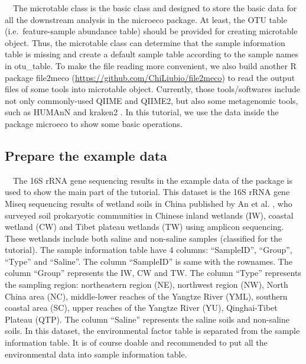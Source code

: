 \documentclass[
]{book}
\begin{document}
　The microtable class is the basic class and designed to store the basic data for all the downstream analysis in the microeco package.
At least, the OTU table (i.e.~feature-sample abundance table) should be provided for creating microtable object.
Thus, the microtable class can determine that the sample information table is missing and create a default sample table according to
the sample names in otu\_table.
To make the file reading more convenient,
we also build another R package file2meco (\url{https://github.com/ChiLiubio/file2meco}) to read the output files of some tools into microtable object.
Currently, those tools/softwares include not only commonly-used QIIME \citep{Caporaso_QIIME_2010} and QIIME2\citep{Bolyen_Reproducible_2019},
but also some metagenomic tools, such as HUMAnN \citep{Franzosa_Species_2018} and kraken2 \citep{Wood_Improved_2019}.
In this tutorial, we use the data inside the package microeco to show some basic operations.

\hypertarget{prepare-the-example-data}{%
\subsection{Prepare the example data}\label{prepare-the-example-data}}

　The 16S rRNA gene sequencing results in the example data of the package is used to show the main part of the tutorial.
This dataset is the 16S rRNA gene Miseq sequencing results of wetland soils in China published by An et al. \citep{An_Soil_2019},
who surveyed soil prokaryotic communities in Chinese inland wetlands (IW),
coastal wetland (CW) and Tibet plateau wetlands (TW) using amplicon sequencing.
These wetlands include both saline and non-saline samples (classified for the tutorial).
The sample information table have 4 columns: ``SampleID'', ``Group'', ``Type'' and ``Saline''.
The column ``SampleID'' is same with the rownames.
The column ``Group'' represents the IW, CW and TW.
The column ``Type'' represents the sampling region: northeastern region (NE), northwest region (NW), North China area (NC),
middle-lower reaches of the Yangtze River (YML), southern coastal area (SC), upper reaches of the Yangtze River (YU), Qinghai-Tibet Plateau (QTP).
The column ``Saline'' represents the saline soils and non-saline soils.
In this dataset, the environmental factor table is separated from the sample information table.
It is of course doable and recommended to put all the environmental data into sample information table.
\end{document}
